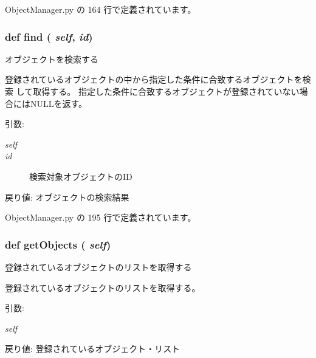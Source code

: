  ObjectManager.py の 164 行で定義されています。
\subsubsection{\setlength{\rightskip}{0pt plus 5cm}def find ( {\em self},  {\em id})}\label{classsource__py_1_1_object_manager_1_1_object_manager_01f90f57b7acd55e177611f5d0f7df23}


オブジェクトを検索する 

登録されているオブジェクトの中から指定した条件に合致するオブジェクトを検索 して取得する。 指定した条件に合致するオブジェクトが登録されていない場合にはNULLを返す。

\begin{Desc}
\item[引数:]
\begin{description}
\item[{\em self}]\item[{\em id}]検索対象オブジェクトのID\end{description}
\end{Desc}
\begin{Desc}
\item[戻り値:]オブジェクトの検索結果 \end{Desc}


 ObjectManager.py の 195 行で定義されています。
\subsubsection{\setlength{\rightskip}{0pt plus 5cm}def getObjects ( {\em self})}\label{classsource__py_1_1_object_manager_1_1_object_manager_38d28fb49e2d3f0c5b1ce9ba7fa66864}


登録されているオブジェクトのリストを取得する 

登録されているオブジェクトのリストを取得する。

\begin{Desc}
\item[引数:]
\begin{description}
\item[{\em self}]\end{description}
\end{Desc}
\begin{Desc}
\item[戻り値:]登録されているオブジェクト・リスト \end{Desc}



